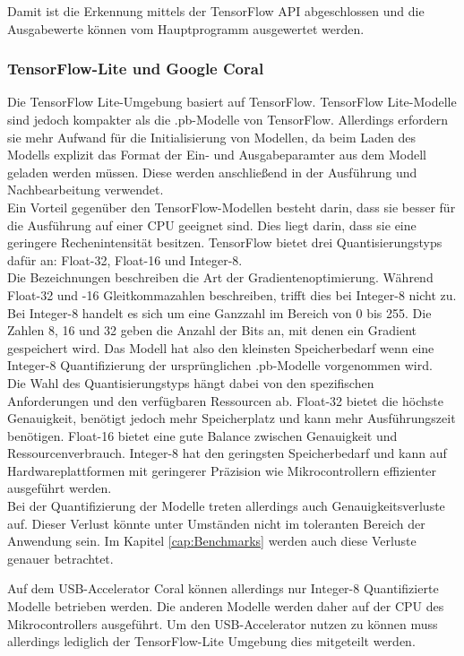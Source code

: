 Damit ist die Erkennung mittels der TensorFlow API abgeschlossen und die Ausgabewerte können vom Hauptprogramm ausgewertet werden.

\subsubsection{TensorFlow-Lite und Google Coral}

Die TensorFlow Lite-Umgebung basiert auf TensorFlow. TensorFlow Lite-Modelle sind jedoch kompakter als die .pb-Modelle von TensorFlow. Allerdings erfordern sie mehr Aufwand für die Initialisierung von Modellen, da beim Laden des Modells explizit das Format der Ein- und Ausgabeparamter aus dem Modell geladen werden müssen. Diese werden anschließend in der Ausführung und Nachbearbeitung verwendet.
\\
Ein Vorteil gegenüber den TensorFlow-Modellen besteht darin, dass sie besser für die Ausführung auf einer CPU geeignet sind. Dies liegt darin, dass sie eine geringere Rechenintensität besitzen. TensorFlow bietet drei Quantisierungstyps dafür an: Float-32, Float-16 und Integer-8.
\\
Die Bezeichnungen beschreiben die Art der Gradientenoptimierung. Während Float-32 und -16 Gleitkommazahlen beschreiben, trifft dies bei Integer-8 nicht zu. Bei Integer-8 handelt es sich um eine Ganzzahl im Bereich von 0 bis 255. Die Zahlen 8, 16 und 32 geben die Anzahl der Bits an, mit denen ein Gradient gespeichert wird. Das Modell hat also den kleinsten Speicherbedarf wenn eine Integer-8 Quantifizierung der ursprünglichen .pb-Modelle vorgenommen wird.
\\
Die Wahl des Quantisierungstyps hängt dabei von den spezifischen Anforderungen und den verfügbaren Ressourcen ab. Float-32 bietet die höchste Genauigkeit, benötigt jedoch mehr Speicherplatz und kann mehr Ausführungszeit benötigen. Float-16 bietet eine gute Balance zwischen Genauigkeit und Ressourcenverbrauch. Integer-8 hat den geringsten Speicherbedarf und kann auf Hardwareplattformen mit geringerer Präzision wie Mikrocontrollern effizienter ausgeführt werden.
\\
Bei der Quantifizierung der Modelle treten allerdings auch Genauigkeitsverluste auf. Dieser Verlust könnte unter Umständen nicht im toleranten Bereich der Anwendung sein. Im Kapitel \ref{cap:Benchmarks} werden auch diese Verluste genauer betrachtet.
\cite{tens_zoo}

Auf dem USB-Accelerator Coral können allerdings nur Integer-8 Quantifizierte Modelle betrieben werden. Die anderen Modelle werden daher auf der CPU des Mikrocontrollers ausgeführt. Um den USB-Accelerator nutzen zu können muss allerdings lediglich der TensorFlow-Lite Umgebung dies mitgeteilt werden. \cite{coral_google}

